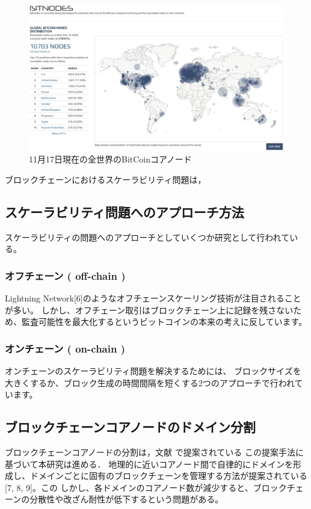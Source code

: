 \documentclass[a4paper,12pt]{jsarticle}
\begin{document}
\begin{figure}[H]%
  \begin{center}
    \includegraphics[width=130mm]{pht/bitnodes1117.eps}
  \end{center}
  \caption{11月17日現在の全世界のBitCoinコアノード}
  \label{fig:bitnodes}
\end{figure}
ブロックチェーンにおけるスケーラビリティ問題は，

      \subsection{スケーラビリティ問題へのアプローチ方法}
スケーラビリティの問題へのアプローチとしていくつか研究として行われている。

          \subsubsection{オフチェーン ( off-chain )}
Lightning Network[6]のようなオフチェーンスケーリング技術が注目されることが多い。
しかし、オフチェーン取引はブロックチェーン上に記録を残さないため、監査可能性を最大化するというビットコインの本来の考えに反しています。

          \subsubsection{オンチェーン ( on-chain )}
オンチェーンのスケーラビリティ問題を解決するためには、
ブロックサイズを大きくするか、ブロック生成の時間間隔を短くする2つのアプローチで行われています。

      \subsection{ブロックチェーンコアノードのドメイン分割}
ブロックチェーンコアノードの分割は，文献 \cite{fujihara1}\cite{fujihara2}で提案されている
この提案手法に基づいて本研究は進める．
地理的に近いコアノード間で自律的にドメインを形成し、ドメインごとに固有のブロックチェーンを管理する方法が提案されている[7, 8, 9]。この
しかし、各ドメインのコアノード数が減少すると、ブロックチェーンの分散性や改ざん耐性が低下するという問題がある。
\end{document}
